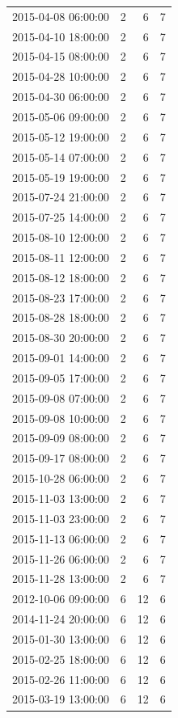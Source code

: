 \begin{tabular}{lrrr}
2015-04-08 06:00:00 & 2 & 6 & 7 \\
2015-04-10 18:00:00 & 2 & 6 & 7 \\
2015-04-15 08:00:00 & 2 & 6 & 7 \\
2015-04-28 10:00:00 & 2 & 6 & 7 \\
2015-04-30 06:00:00 & 2 & 6 & 7 \\
2015-05-06 09:00:00 & 2 & 6 & 7 \\
2015-05-12 19:00:00 & 2 & 6 & 7 \\
2015-05-14 07:00:00 & 2 & 6 & 7 \\
2015-05-19 19:00:00 & 2 & 6 & 7 \\
2015-07-24 21:00:00 & 2 & 6 & 7 \\
2015-07-25 14:00:00 & 2 & 6 & 7 \\
2015-08-10 12:00:00 & 2 & 6 & 7 \\
2015-08-11 12:00:00 & 2 & 6 & 7 \\
2015-08-12 18:00:00 & 2 & 6 & 7 \\
2015-08-23 17:00:00 & 2 & 6 & 7 \\
2015-08-28 18:00:00 & 2 & 6 & 7 \\
2015-08-30 20:00:00 & 2 & 6 & 7 \\
2015-09-01 14:00:00 & 2 & 6 & 7 \\
2015-09-05 17:00:00 & 2 & 6 & 7 \\
2015-09-08 07:00:00 & 2 & 6 & 7 \\
2015-09-08 10:00:00 & 2 & 6 & 7 \\
2015-09-09 08:00:00 & 2 & 6 & 7 \\
2015-09-17 08:00:00 & 2 & 6 & 7 \\
2015-10-28 06:00:00 & 2 & 6 & 7 \\
2015-11-03 13:00:00 & 2 & 6 & 7 \\
2015-11-03 23:00:00 & 2 & 6 & 7 \\
2015-11-13 06:00:00 & 2 & 6 & 7 \\
2015-11-26 06:00:00 & 2 & 6 & 7 \\
2015-11-28 13:00:00 & 2 & 6 & 7 \\
2012-10-06 09:00:00 & 6 & 12 & 6 \\
2014-11-24 20:00:00 & 6 & 12 & 6 \\
2015-01-30 13:00:00 & 6 & 12 & 6 \\
2015-02-25 18:00:00 & 6 & 12 & 6 \\
2015-02-26 11:00:00 & 6 & 12 & 6 \\
2015-03-19 13:00:00 & 6 & 12 & 6 \\

\end{tabular}
